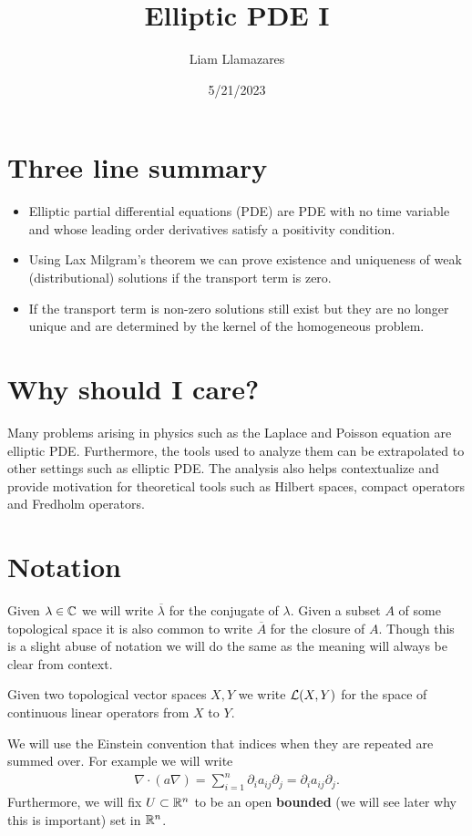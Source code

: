 \documentclass[12pt]{article}
\begin{document}
\title{Elliptic PDE I}
\author{Liam Llamazares}
\date{5/21/2023}
\maketitle
\section{ Three line summary}
\begin{itemize}
	\item Elliptic partial differential equations (PDE) are PDE with no time variable and whose leading order derivatives satisfy a positivity condition.
	\item Using Lax Milgram's theorem we can prove existence and uniqueness of weak (distributional) solutions if the transport term is zero.
	\item If the transport term is non-zero solutions still exist but they are no longer unique and are determined by the kernel of the homogeneous problem.\end{itemize}
\section{Why should I care?}
Many problems arising in physics such as the Laplace and Poisson equation are elliptic PDE. Furthermore, the tools used to analyze them can be extrapolated to other settings such as
elliptic PDE. The analysis also helps contextualize and provide motivation for theoretical tools such as Hilbert spaces, compact operators and Fredholm operators.
\section{Notation}
Given $\lambda \in \mathbb{C}$ we will write $\overline{\lambda }$ for the conjugate of $\lambda $. Given a subset $A$ of some topological space it is also common to write  $\overline{A}$ for the closure of $A$. Though this is a slight abuse of notation we will do the same as the meaning will always be clear from context.

Given two topological vector spaces $X,Y$ we write  $\mathcal{L}(X,Y)$ for the space of continuous linear operators from $X$ to  $Y$.

We will use the Einstein convention that indices when they are repeated are summed over. For example we will write
\begin{align*}
	\nabla \cdot (a \nabla)=\sum_{i=1}^n \partial_i a_{ij} \partial _j =\partial_i a_{ij} \partial _j.
\end{align*}
Furthermore, we will fix $U \subset \mathbb{R}^n$ to be an open \textbf{bounded} (we will see later why this is important) set in $\mathbb{R}^n$.
\end{document}
